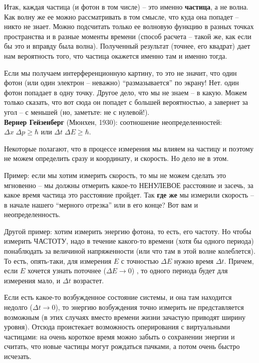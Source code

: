 \documentclass[12pt,epsfig,color,russian]{article}
\begin{document}
Итак, каждая частица (и фотон в том числе) -- это именно {\bf частица}, а не волна. Как волну же ее можно рассматривать в том смысле, что куда она попадет -- никто не знает. Можно подсчитать только ее волновую функцию в разных точках пространства и в разные моменты времени (способ расчета -- такой же, как если бы это и вправду была волна). Полученный результат (точнее, его квадрат) дает нам вероятность того, что частица окажется именно там и именно тогда.

Если мы получаем интерференционную картину, то это не значит, что один фотон (или один электрон -- неважно) ``размазывается'' по экрану! Нет. один фотон попадает в одну точку. Другое дело, что мы не знаем -- в какую. Можем только сказать, что вот сюда он попадет с большей вероятностью, а завернет за угол -- с меньшей (но, заметьте: не с нулевой!).\\[5mm]

{\bf Вернер Гейзенберг} (Мюнхен, 1930): соотношение неопределенностей: $\Delta x\;\Delta p\geq \hbar$ или $\Delta t\;\Delta E\geq \hbar$.

Некоторые полагают, что в процессе измерения мы влияем на частицу и поэтому не можем определить сразу и координату, и скорость. Но дело не в этом.

Пример: если мы хотим измерить скорость, то мы не можем сделать это мгновенно -- мы должны отмерить какое-то НЕНУЛЕВОЕ расстояние и засечь, за какое время частица это расстояние пройдет. Так {\bf где же} мы измерили скорость -- в начале нашего ``мерного отрезка'' или в его конце? Вот вам и неопределенность.

Другой пример: хотим измерить энергию фотона, то есть, его частоту. Но чтобы измерить ЧАСТОТУ, надо в течение какого-то времени (хотя бы одного периода) понаблюдать за величиной напряженности (или что там в этой волне колеблется). То есть, опять-таки, для измерения $E$ с точностью $\Delta E$ нужно время $\Delta t$. Причем, если $E$ хочется узнать поточнее ($\Delta E\rightarrow0$) , то одного периода будет для измерения мало, и $\Delta t$ возрастет.

Если есть какое-то возбужденное состояние системы, и она там находится недолго  ($\Delta t\rightarrow0$), то энергию возбуждения точно измерить не представляется возможным (в этих случаях вместо времени жизни зачастую приводят ширину уровня). Отсюда проистекает возможность оперирования с виртуальными частицами: на очень короткое время можно забыть о сохранении энергии и считать, что новые частицы могут рождаться пачками, а потом очень быстро исчезать.\\[5mm]
\end{document}

